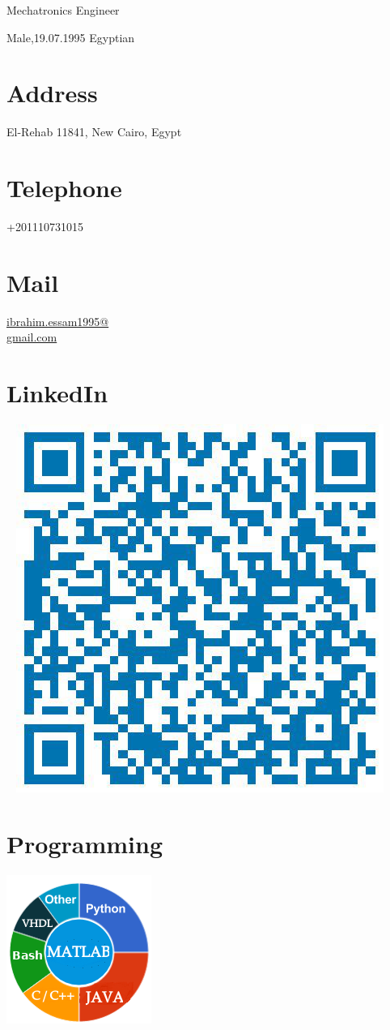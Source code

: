 \documentclass[]{friggeri-cv}
\begin{document}
      {Mechatronics Engineer}
      

\begin{aside}
 \textcolor{lightgray}{                    }
    Male,19.07.1995
    Egyptian
  \section{Address}
    El-Rehab
    11841, New Cairo, Egypt
    ~
  \section{Telephone}
    +201110731015
    ~
  \section{Mail}
    \href{mailto:ibrahim.essam1995@gmail.com}{ibrahim.essam1995@\\gmail.com}
    ~
  \section{LinkedIn}
    ~  
   \includegraphics[scale=0.20]{img/qr.jpg}
    ~
  \section{Programming}
    \includegraphics[scale=0.62]{img/programming.png}
    ~

\end{aside}
\end{document}
